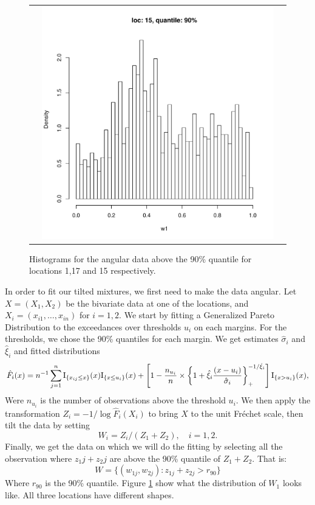 \documentclass[10pt]{report}
\begin{document}
\begin{figure}[h]
\begin{tabular}{ccc}
&
\includegraphics[width=\textwidth/3]{../img/loc15/quantile90/histogram.pdf}\\
\end{tabular}
\caption{Histograms for the angular data above the 90\% quantile for locations 1,17 and 15 respectively.}
\label{fig:data_hist}
\end{figure}

In order to fit our tilted mixtures, we first need to make the data angular.
Let $X=(X_1,X_2)$ be the bivariate data at one of the locations, and $X_i = (x_{i1}, \ldots, x_{in})$ for $i=1,2$.
We start by fitting a Generalized Pareto Distribution to the exceedances over thresholds $u_i$ on each margins. For the thresholds, we chose the 90\% quantiles for each margin. We get estimates $\hat \sigma_i$ and $\hat \xi_i$  and fitted distributions
$$
\hat F_i(x) = n^{-1} \sum_{j=1}^n {\rm I}_{\{x_{ij}\leq x\}} (x)  {\rm I}_{\{x\leq u_i\}} (x) + \left[ 1 - \frac{n_{u_i}}{n} \times \left\{1 + \hat\xi_i\frac{(x-u_i)}{\hat \sigma_i} \right\}^{-1/\hat\xi_i}_+ \right] {\rm I}_{\{x>u_i\}} (x),
$$
Were $n_{u_i}$ is the number of observations above the threshold $u_i$. We then apply the transformation $ Z_i = -1/ \log \hat F_i(X_i)$ to bring $X$ to the unit Fréchet scale, then tilt the data by setting
$$
W_i = Z_i/(Z_1 + Z_2), \quad i=1,2.
$$
Finally, we get the data on which we will do the fitting by selecting all the observation where $z_1j + z_2j$ are above the 90\% quantile of $Z_1 + Z_2$. That is:
$$
W = \{ (w_{1j},w_{2j}) : z_{1j} + z_{2j} > r_{90} \}
$$
Where $r_{90}$ is the 90\% quantile. Figure \ref{fig:data_hist} show what the distribution of $W_1$ looks like. All three locations have different shapes.
\end{document}
